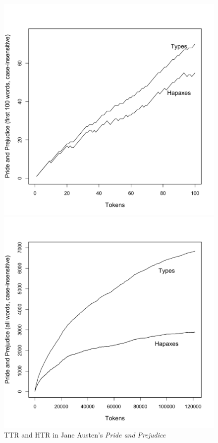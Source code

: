 \begin{figure}
\caption{TTR and HTR in Jane Austen's \textit{Pride and Prejudice}}
\label{fig:typehapaxausten}
\begin{minipage}{.5\textwidth}
  \centering
  \includegraphics[width=\textwidth]{figures/prideandprejudiceonehundred}
\end{minipage}%
\begin{minipage}{.5\textwidth}
  \centering
  \includegraphics[width=\textwidth]{figures/prideandprejudiceall}
\end{minipage}
\end{figure}


